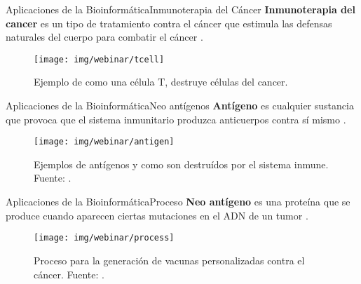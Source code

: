 \documentclass[10pt]{beamer}
\newcommand{\chref}[3][blue]{\href{#2}{\color{#1}{#3}}}%
\newcommand{\chref}[2]{	\href{#1}{{\usebeamercolor[bg]{Feather}#2}} }
\newcommand{\chref}[3][blue]{\href{#2}{\color{#1}{#3}}}%
\newcommand{\1}{
        	\setbeamertemplate{background}{
        		\texttt{[image: img/1]}
        		\tikz[overlay] \fill[fill opacity=0.75,fill=white] (0,0) rectangle (-\paperwidth,\paperheight);
        	}
}
\begin{document}
\begin{frame}{Aplicaciones de la Bioinformática}{Inmunoterapia del Cáncer}		
	\textbf{Inmunoterapia del cancer} es un tipo de tratamiento contra el cáncer que estimula las defensas naturales del cuerpo para combatir el cáncer \cite{inmunoterapy2022}.
	
	\begin{figure}
		\texttt{[image: img/webinar/tcell]}
		\caption{Ejemplo de como una célula T, destruye células del cancer.}
	\end{figure}		
\end{frame}

\begin{frame}{Aplicaciones de la Bioinformática}{Neo antígenos}		
	\textbf{Antígeno} es cualquier sustancia que provoca que el sistema inmunitario produzca anticuerpos contra sí mismo \cite{antigen2022}.
	
	\begin{figure}
		\texttt{[image: img/webinar/antigen]}
		\caption{Ejemplos de antígenos y como son destruídos por el sistema inmune. Fuente: \chref{https://www.britannica.com/science/antigen}{enlace}.}
	\end{figure}		
\end{frame}

\begin{frame}{Aplicaciones de la Bioinformática}{Proceso}		
	\textbf{Neo antígeno} es una proteína que se produce cuando aparecen ciertas mutaciones en el ADN de un tumor \cite{neoantigen2022}.
	
	\begin{figure}
		\texttt{[image: img/webinar/process]}
		\caption{Proceso para la generación de vacunas personalizadas contra el cáncer. Fuente: \cite{peng2019neoantigen}.}
	\end{figure}		
\end{frame}
\end{document}
